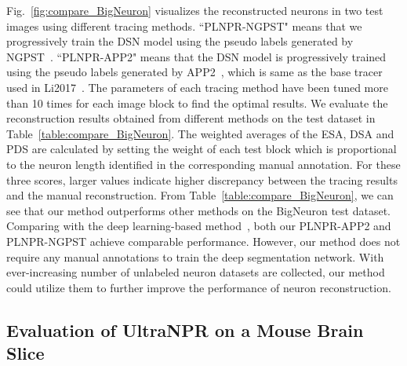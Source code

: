 Fig.~\ref{fig:compare_BigNeuron} visualizes the reconstructed neurons in two test images using different tracing methods.
``PLNPR-NGPST" means that we progressively train the DSN model using the pseudo labels generated by NGPST~\cite{Quan2015}.
``PLNPR-APP2" means that the DSN model is progressively trained using the pseudo labels generated by APP2~\cite{Xiao2013}, which is same as the base tracer used in Li2017~\cite{Li2017}.
The parameters of each tracing method have been tuned more than 10 times for each image block to find the optimal results.
%
We evaluate the reconstruction results obtained from different methods on the test dataset in Table~\ref{table:compare_BigNeuron}.
The weighted averages of the ESA, DSA and PDS are calculated by setting the weight of each test block which is proportional to the neuron length identified in the corresponding manual annotation.
For these three scores, larger values indicate higher discrepancy between the tracing results and the manual reconstruction.
%
From Table~\ref{table:compare_BigNeuron}, we can see that our method outperforms other methods on the BigNeuron test dataset.
%
Comparing with the deep learning-based method~\cite{Li2017}, both our PLNPR-APP2 and PLNPR-NGPST achieve comparable performance.
However, our method does not require any manual annotations to train the deep segmentation network.
With ever-increasing number of unlabeled neuron datasets are collected, our method could utilize them to further improve the performance of neuron reconstruction.




\subsection{Evaluation of UltraNPR on a Mouse Brain Slice}
\label{sec:exp_UltraNPR}

